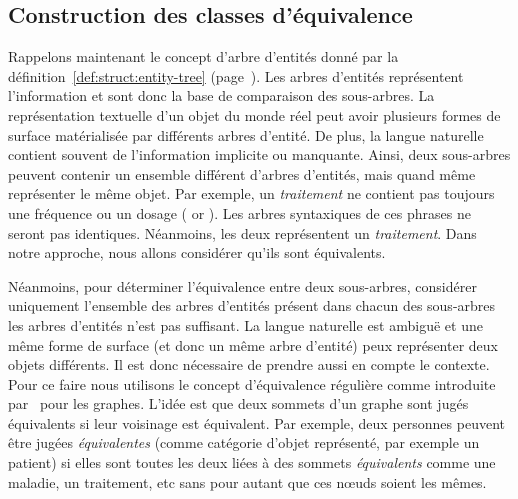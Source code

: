 \subsection{Construction des classes d'équivalence}
\label{sec:struct:equiv-classes}
Rappelons maintenant le concept d'arbre d'entités donné par la définition~\ref{def:struct:entity-tree} (page~\pageref{def:struct:entity-tree}).
Les arbres d'entités représentent l'information et sont donc la base de comparaison des sous-arbres.
La représentation textuelle d'un objet du monde réel peut avoir plusieurs formes de surface matérialisée par différents arbres d'entité.
De plus, la langue naturelle contient souvent de l'information implicite ou manquante.
Ainsi, deux sous-arbres peuvent contenir un ensemble différent d'arbres d'entités, mais quand même représenter le même objet.
Par exemple, un \emph{traitement} ne contient pas toujours une fréquence ou un dosage ( or ).
Les arbres syntaxiques de ces phrases ne seront pas identiques.
Néanmoins, les deux représentent un \emph{traitement}.
Dans notre approche, nous allons considérer qu'ils sont équivalents.

Néanmoins, pour déterminer l'équivalence entre deux sous-arbres, considérer uniquement l'ensemble des arbres d'entités présent dans chacun des sous-arbres les arbres d'entités n'est pas suffisant.
La langue naturelle est ambiguë et une même forme de surface (et donc un même arbre d'entité) peux représenter deux objets différents.
Il est donc nécessaire de prendre aussi en compte le contexte.
Pour ce faire nous utilisons le concept d'équivalence régulière comme introduite par~\cite{whiteGraphSemigroupHomomorphisms1983} pour les graphes.
L'idée est que deux sommets d'un graphe sont jugés équivalents si leur voisinage est équivalent.
Par exemple, deux personnes peuvent être jugées \emph{équivalentes} (comme catégorie d'objet représenté, par exemple un patient) si elles sont toutes les deux liées à des sommets \emph{équivalents} comme une maladie, un traitement, etc sans pour autant que ces nœuds soient les mêmes.

